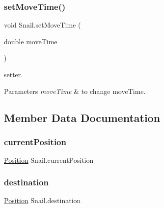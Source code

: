 \subsubsection{\texorpdfstring{set\+Move\+Time()}{setMoveTime()}}
{\footnotesize\ttfamily void Snail.\+set\+Move\+Time (\begin{DoxyParamCaption}\item[{double}]{move\+Time }\end{DoxyParamCaption})\hspace{0.3cm}{\ttfamily [inline]}}

setter. 
\begin{DoxyParams}{Parameters}
{\em move\+Time} & to change move\+Time. \\
\hline
\end{DoxyParams}


\subsection{Member Data Documentation}
\mbox{\label{class_snail_a546a453e906d3fc883d3ce5d2aa44915}} 
\subsubsection{\texorpdfstring{current\+Position}{currentPosition}}
{\footnotesize\ttfamily \mbox{\hyperlink{class_position}{Position}} Snail.\+current\+Position\hspace{0.3cm}{\ttfamily [protected]}}

\mbox{\label{class_snail_a93d9364d2800a8ad4ca04e0a4646e3d6}} 
\subsubsection{\texorpdfstring{destination}{destination}}
{\footnotesize\ttfamily \mbox{\hyperlink{class_position}{Position}} Snail.\+destination\hspace{0.3cm}{\ttfamily [private]}}

\mbox{\label{class_snail_a76d36543b0b95a0e09f1f923d2835d7e}} 
